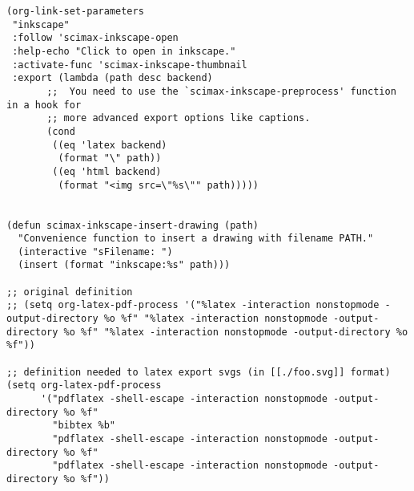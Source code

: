 \documentclass[8pt]{article}
\begin{document}
\begin{verbatim}
(org-link-set-parameters
 "inkscape"
 :follow 'scimax-inkscape-open
 :help-echo "Click to open in inkscape."
 :activate-func 'scimax-inkscape-thumbnail
 :export (lambda (path desc backend)
	   ;;  You need to use the `scimax-inkscape-preprocess' function in a hook for
	   ;; more advanced export options like captions.
	   (cond
	    ((eq 'latex backend)
	     (format "\" path))
	    ((eq 'html backend)
	     (format "<img src=\"%s\"" path)))))


(defun scimax-inkscape-insert-drawing (path)
  "Convenience function to insert a drawing with filename PATH."
  (interactive "sFilename: ")
  (insert (format "inkscape:%s" path)))

;; original definition
;; (setq org-latex-pdf-process '("%latex -interaction nonstopmode -output-directory %o %f" "%latex -interaction nonstopmode -output-directory %o %f" "%latex -interaction nonstopmode -output-directory %o %f"))

;; definition needed to latex export svgs (in [[./foo.svg]] format)
(setq org-latex-pdf-process
      '("pdflatex -shell-escape -interaction nonstopmode -output-directory %o %f"
        "bibtex %b"
        "pdflatex -shell-escape -interaction nonstopmode -output-directory %o %f"
        "pdflatex -shell-escape -interaction nonstopmode -output-directory %o %f"))
\end{verbatim}
\end{document}
